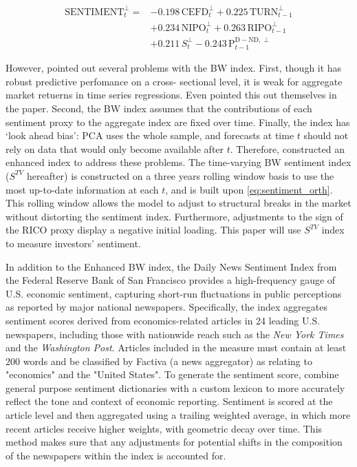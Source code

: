 \begin{equation}
    \label{eq:sentiment_orth}
    \begin{split}
    \text{SENTIMENT}^{\perp}_t = &-0.198\,\text{CEFD}^{\perp}_t + 0.225\,\text{TURN}^{\perp}_{t-1} \\
    &+ 0.234\,\text{NIPO}^{\perp}_t + 0.263\,\text{RIPO}^{\perp}_{t-1} \\
    &+ 0.211\,S^{\perp}_t - 0.243\,\text{P}^{\text{D} - \text{ND},\perp}_{t-1}
    \end{split}
\end{equation}


However,  pointed out several problems with the BW index. First, though it has robust predictive perfomance on a cross- sectional level, it is weak for aggregate market retuerns in time series regressions. Even  pointed this out themselves in the paper. Second, the BW index assumes that the contributions of each sentiment proxy to the aggregate index are fixed over time. Finally, the index has `look ahead bias': PCA uses the whole sample, and forecasts at time $t$ should not rely on data that would only become available after $t$. Therefore,  constructed an enhanced index to address these problems. The time-varying BW sentiment index ($S^{TV}$ hereafter) is constructed on a three years rolling window basis to use the most up-to-date information at each $t$, and is built upon \cref{eq:sentiment_orth}. This rolling window allows the model to adjust to structural breaks in the market without distorting the sentiment index. Furthermore, adjustments to the sign of the RICO proxy display a negative initial loading. This paper will use  $S^{TV}$ index to measure investors' sentiment.

In addition to the Enhanced BW index, the Daily News Sentiment Index from the Federal Reserve Bank of San Francisco provides a high-frequency gauge of U.S. economic sentiment, capturing short-run fluctuations in public perceptions as reported by major national newspapers. Specifically, the index aggregates sentiment scores derived from economics-related articles in 24 leading U.S. newspapers, including those with nationwide reach such as the \emph{New York Times} and the \emph{Washington Post}. Articles included in the measure must contain at least 200 words and be classified by Factiva (a news aggregator) as relating to "economics" and the "United States". To generate the sentiment score,  combine general purpose sentiment dictionaries with a custom lexicon to more accurately reflect the tone and context of economic reporting. Sentiment is scored at the article level and then aggregated using a trailing weighted average, in which more recent articles receive higher weights, with geometric decay over time. This method makes sure that any adjustments for potential shifts in the composition of the newspapers within the index is accounted for.

